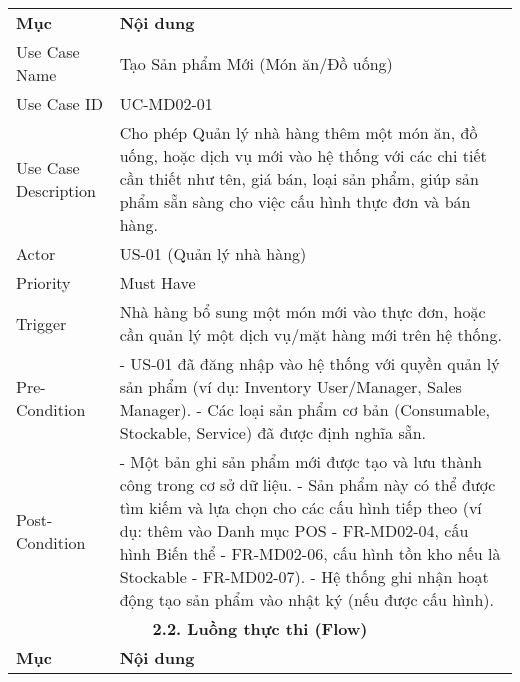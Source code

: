\begin{longtable}{|m{4cm}|p{11cm}|}
\hline
\endlastfoot %
\multicolumn{2}{|c|}{\textbf{2.1. Tóm tắt (Summary)}} \\
\hline
\textbf{Mục} & \textbf{Nội dung} \\
\hline
Use Case Name & Tạo Sản phẩm Mới (Món ăn/Đồ uống) \\
\hline
Use Case ID & UC-MD02-01 \\
\hline
Use Case Description & Cho phép Quản lý nhà hàng thêm một món ăn, đồ uống, hoặc dịch vụ mới vào hệ thống với các chi tiết cần thiết như tên, giá bán, loại sản phẩm, giúp sản phẩm sẵn sàng cho việc cấu hình thực đơn và bán hàng. \\
\hline
Actor & US-01 (Quản lý nhà hàng) \\
\hline
Priority & Must Have \\
\hline
Trigger & Nhà hàng bổ sung một món mới vào thực đơn, hoặc cần quản lý một dịch vụ/mặt hàng mới trên hệ thống. \\
\hline
Pre-Condition & - US-01 đã đăng nhập vào hệ thống với quyền quản lý sản phẩm (ví dụ: Inventory User/Manager, Sales Manager). \newline - Các loại sản phẩm cơ bản (Consumable, Stockable, Service) đã được định nghĩa sẵn. \\
\hline
Post-Condition & - Một bản ghi sản phẩm mới được tạo và lưu thành công trong cơ sở dữ liệu. \newline - Sản phẩm này có thể được tìm kiếm và lựa chọn cho các cấu hình tiếp theo (ví dụ: thêm vào Danh mục POS - FR-MD02-04, cấu hình Biến thể - FR-MD02-06, cấu hình tồn kho nếu là Stockable - FR-MD02-07). \newline - Hệ thống ghi nhận hoạt động tạo sản phẩm vào nhật ký (nếu được cấu hình). \\
\hline
\multicolumn{2}{|c|}{\textbf{2.2. Luồng thực thi (Flow)}} \\
\hline
\textbf{Mục} & \textbf{Nội dung} \\
\hline

\end{longtable}
